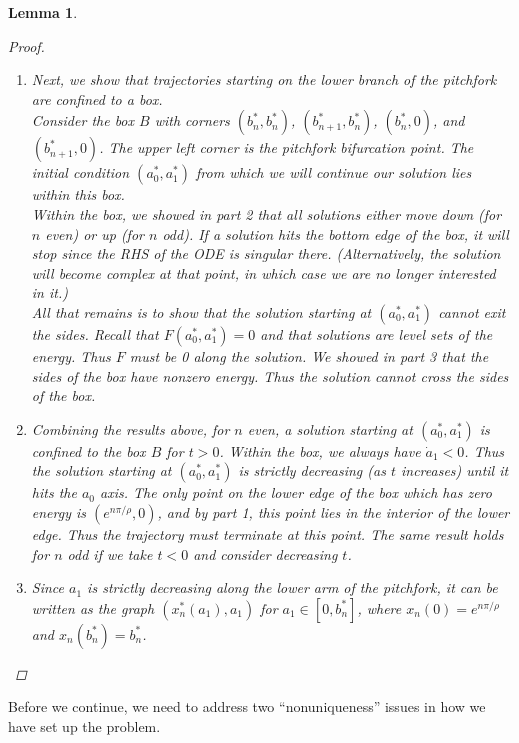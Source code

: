 \documentclass[12pt]{article}
\newtheorem{lemma}{Lemma}
\begin{document}
\begin{lemma}
\begin{proof}
\begin{enumerate}
\item Next, we show that trajectories starting on the lower branch of the pitchfork are confined to a box.\\ 

Consider the box $B$ with corners $(b^*_n, b^*_n)$, $(b^*_{n+1}, b^*_n)$, $(b^*_n, 0)$, and $(b^*_{n+1}, 0)$. The upper left corner is the pitchfork bifurcation point. The initial condition $(a_0^*, a_1^*)$ from which we will continue our solution lies within this box.\\

Within the box, we showed in part 2 that all solutions either move down (for $n$ even) or up (for $n$ odd). If a solution hits the bottom edge of the box, it will stop since the RHS of the ODE is singular there. (Alternatively, the solution will become complex at that point, in which case we are no longer interested in it.)\\

All that remains is to show that the solution starting at $(a_0^*, a_1^*)$ cannot exit the sides. Recall that $F(a_0^*, a_1^*) = 0$ and that solutions are level sets of the energy. Thus $F$ must be 0 along the solution. We showed in part 3 that the sides of the box have nonzero energy. Thus the solution cannot cross the sides of the box.

\item Combining the results above, for $n$ even, a solution starting at $(a_0^*, a_1^*)$ is confined to the box $B$ for $t > 0$. Within the box, we always have $\dot a_1 < 0$. Thus the solution starting at $(a_0^*, a_1^*)$ is strictly decreasing (as $t$ increases) until it hits the $a_0$ axis. The only point on the lower edge of the box which has zero energy is $(e^{n \pi/\rho}, 0)$, and by part 1, this point lies in the interior of the lower edge. Thus the trajectory must terminate at this point. The same result holds for $n$ odd if we take $t < 0$ and consider decreasing $t$.

\item Since $a_1$ is strictly decreasing along the lower arm of the pitchfork, it can be written as the graph $(x_n^*(a_1), a_1)$ for $a_1 \in [0, b_n^*]$, where $x_n(0) = e^{n \pi/\rho}$ and $x_n(b_n^*) = b_n^*$.

\end{enumerate}

\end{proof}
\end{lemma}

Before we continue, we need to address two ``nonuniqueness'' issues in how we have set up the problem.\\
\end{document}
